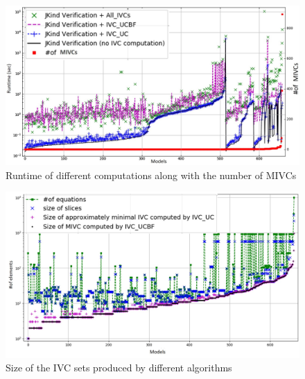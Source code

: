  \begin{figure}
 \centering
  \includegraphics[width=\columnwidth]{figs/size.jpg}
  \caption{Runtime of different computations along with the number of MIVCs}
  \vspace{0.1in}
  \label{fig:modelsize}
\end{figure}


\begin{figure}
  \centering
  \includegraphics[width=\columnwidth]{figs/min.jpg}
  \caption{Size of the IVC sets produced by different algorithms}
 \label{fig:size}
\end{figure}



